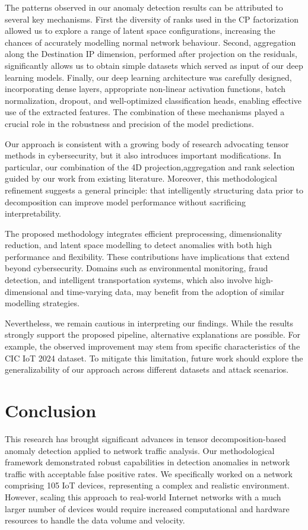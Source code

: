 \documentclass[pdflatex,sn-mathphys-num]{sn-jnl}
\theoremstyle{thmstyleone}
\theoremstyle{thmstyletwo}
\theoremstyle{thmstylethree}
\begin{document}
The patterns observed in our anomaly detection results can be attributed to several key mechanisms. First the diversity of ranks used in the CP factorization allowed us to explore a range of latent space configurations, increasing the chances of accurately modelling normal network behaviour. Second, aggregation along the Destination IP dimension, performed after projection on the residuals, significantly allows us to obtain simple datasets which served as input of our deep learning models. Finally, our deep learning architecture was carefully designed, incorporating dense layers, appropriate non-linear activation functions, batch normalization, dropout, and well-optimized classification heads, enabling effective use of the extracted features. The combination of these mechanisms played a crucial role in the robustness and precision of the model predictions.

Our approach is consistent with a growing body of research advocating tensor methods in cybersecurity, but it also introduces important modifications. In particular, our combination of the 4D projection,aggregation and rank  selection guided by  our work from existing literature. Moreover, this methodological refinement suggests a general principle: that intelligently structuring data prior to decomposition can improve model performance without sacrificing interpretability.

The proposed methodology integrates efficient preprocessing, dimensionality reduction, and latent space modelling to detect anomalies with both high performance and flexibility. These contributions have implications that extend beyond cybersecurity. Domains such as environmental monitoring, fraud detection, and intelligent transportation systems, which also involve high-dimensional and time-varying data, may benefit from the adoption of similar modelling strategies.



Nevertheless, we remain cautious in interpreting our findings. While the results strongly support the proposed pipeline, alternative explanations are possible. For example, the observed improvement may stem from specific characteristics of the CIC IoT 2024 dataset. To mitigate this limitation, future work should explore the generalizability of our approach across different datasets and attack scenarios.

\section{Conclusion}
This research has brought significant advances in tensor decomposition-based anomaly detection applied to network traffic analysis. Our methodological framework demonstrated robust capabilities in  detection anomalies in network traffic with acceptable false positive rates. We specifically worked on a network comprising 105 IoT devices, representing a complex and realistic environment. However, scaling this approach to real-world Internet networks with a much larger number of devices would require increased computational and hardware resources to handle the data volume and velocity. 
\end{document}
